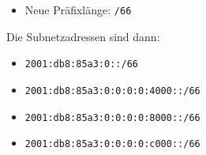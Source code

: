 \documentclass{article}
\begin{document}
\begin{itemize}
    \item Neue Präfixlänge: \texttt{/66}
\end{itemize}

Die Subnetzadressen sind dann:

\begin{itemize}
    \item \texttt{2001:db8:85a3:0::/66}
    \item \texttt{2001:db8:85a3:0:0:0:0:4000::/66}
    \item \texttt{2001:db8:85a3:0:0:0:0:8000::/66}
    \item \texttt{2001:db8:85a3:0:0:0:0:c000::/66}
\end{itemize}
\end{document}
